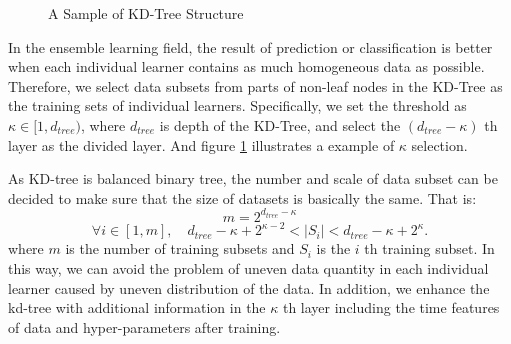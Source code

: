 \documentclass[twoside,leqno,twocolumn]{article}
\begin{document}
\begin{figure}[htbp]
\small
{}

\caption{A Sample of KD-Tree Structure}
\label{fig:KD-Tree}
\end{figure}

In the ensemble learning field, the result of prediction or classification is better when each individual learner contains as much homogeneous data as possible. Therefore, we select data subsets from parts of non-leaf nodes in the KD-Tree as the training sets of individual learners. Specifically, we set the threshold as $\kappa\in[1,d_{tree})$, where $d_{tree}$ is depth of the KD-Tree, and select the $(d_{tree}-\kappa)$ th layer as the divided layer. And figure \ref{fig:KD-Tree} illustrates a example of $\kappa$ selection.

As KD-tree is balanced binary tree, the number and scale of data subset can be decided to make sure that the size of datasets is basically the same. That is:
\[
	m=2^{d_{tree} - \kappa}
\]
\[
		\forall i\in[1,m],\quad  d_{tree} - \kappa + 2^{\kappa-2}<|S_i| < d_{tree} - \kappa + 2^{\kappa}.
\]
where $m$ is the number of training subsets and $S_i$ is the $i$ th training subset. In this way, we can avoid the problem of uneven data quantity in each individual learner caused by uneven distribution of the data. In addition, we enhance the kd-tree with additional information in the $\kappa$ th layer including the time features of data and hyper-parameters after training.
\end{document}
